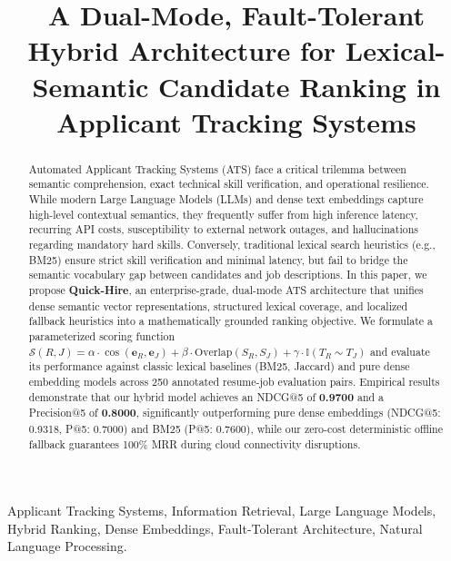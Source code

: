 \documentclass[conference]{IEEEtran}
\begin{document}
\title{A Dual-Mode, Fault-Tolerant Hybrid Architecture for Lexical-Semantic Candidate Ranking in Applicant Tracking Systems}

\author{
}

\maketitle

\begin{abstract}
Automated Applicant Tracking Systems (ATS) face a critical trilemma between semantic comprehension, exact technical skill verification, and operational resilience. While modern Large Language Models (LLMs) and dense text embeddings capture high-level contextual semantics, they frequently suffer from high inference latency, recurring API costs, susceptibility to external network outages, and hallucinations regarding mandatory hard skills. Conversely, traditional lexical search heuristics (e.g., BM25) ensure strict skill verification and minimal latency, but fail to bridge the semantic vocabulary gap between candidates and job descriptions. 
In this paper, we propose \textbf{Quick-Hire}, an enterprise-grade, dual-mode ATS architecture that unifies dense semantic vector representations, structured lexical coverage, and localized fallback heuristics into a mathematically grounded ranking objective. We formulate a parameterized scoring function $\mathcal{S}(R, J) = \alpha \cdot \cos(\mathbf{e}_R, \mathbf{e}_J) + \beta \cdot \text{Overlap}(S_R, S_J) + \gamma \cdot \mathbb{I}(T_R \sim T_J)$ and evaluate its performance against classic lexical baselines (BM25, Jaccard) and pure dense embedding models across 250 annotated resume-job evaluation pairs. Empirical results demonstrate that our hybrid model achieves an NDCG@5 of \textbf{0.9700} and a Precision@5 of \textbf{0.8000}, significantly outperforming pure dense embeddings (NDCG@5: 0.9318, P@5: 0.7000) and BM25 (P@5: 0.7600), while our zero-cost deterministic offline fallback guarantees 100\% MRR during cloud connectivity disruptions.
\end{abstract}

\begin{IEEEkeywords}
Applicant Tracking Systems, Information Retrieval, Large Language Models, Hybrid Ranking, Dense Embeddings, Fault-Tolerant Architecture, Natural Language Processing.
\end{IEEEkeywords}
\end{document}
